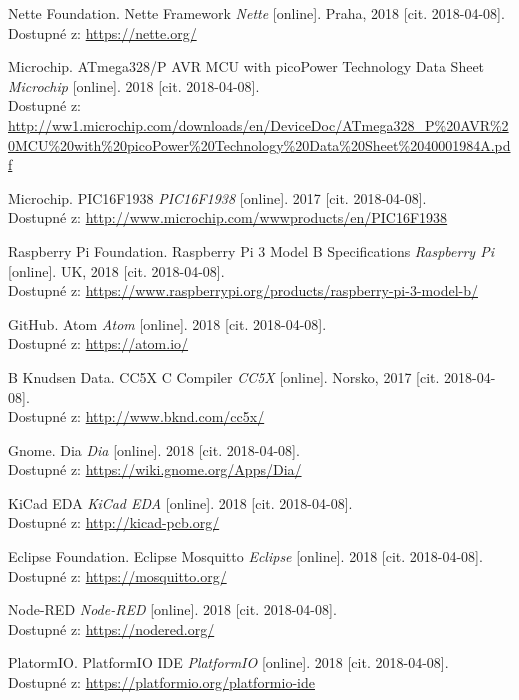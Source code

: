 \documentclass[12pt,a4paper]{article}
\begin{document}
\begin{thebibliography}{99}
Nette Foundation. Nette Framework \emph{Nette} [online]. Praha, 2018 [cit. 2018-04-08]. \\ Dostupné z: \url{https://nette.org/}

Microchip. ATmega328/P AVR MCU with picoPower Technology Data Sheet \emph{Microchip} [online]. 2018 [cit. 2018-04-08]. \\ Dostupné z: \url{http://ww1.microchip.com/downloads/en/DeviceDoc/ATmega328_P%20AVR%20MCU%20with%20picoPower%20Technology%20Data%20Sheet%2040001984A.pdf}

Microchip. PIC16F1938 \emph{PIC16F1938} [online]. 2017 [cit. 2018-04-08]. \\ Dostupné z: \url{http://www.microchip.com/wwwproducts/en/PIC16F1938}

Raspberry Pi Foundation. Raspberry Pi 3 Model B Specifications \emph{Raspberry Pi} [online]. UK, 2018 [cit. 2018-04-08]. \\ Dostupné z: \url{https://www.raspberrypi.org/products/raspberry-pi-3-model-b/}

GitHub. Atom \emph{Atom} [online]. 2018 [cit. 2018-04-08]. \\ Dostupné z: \url{https://atom.io/}

B Knudsen Data. CC5X C Compiler \emph{CC5X} [online]. Norsko, 2017 [cit. 2018-04-08]. \\ Dostupné z: \url{http://www.bknd.com/cc5x/}

Gnome. Dia \emph{Dia} [online]. 2018 [cit. 2018-04-08]. \\ Dostupné z: \url{https://wiki.gnome.org/Apps/Dia/}

KiCad EDA \emph{KiCad EDA} [online]. 2018 [cit. 2018-04-08]. \\ Dostupné z: \url{http://kicad-pcb.org/}

Eclipse Foundation. Eclipse Mosquitto \emph{Eclipse} [online]. 2018 [cit. 2018-04-08]. \\ Dostupné z: \url{https://mosquitto.org/}

Node-RED \emph{Node-RED} [online]. 2018 [cit. 2018-04-08]. \\ Dostupné z: \url{https://nodered.org/}

PlatormIO. PlatformIO IDE \emph{PlatformIO} [online]. 2018 [cit. 2018-04-08]. \\ Dostupné z: \url{https://platformio.org/platformio-ide}


\end{thebibliography}
\end{document}
